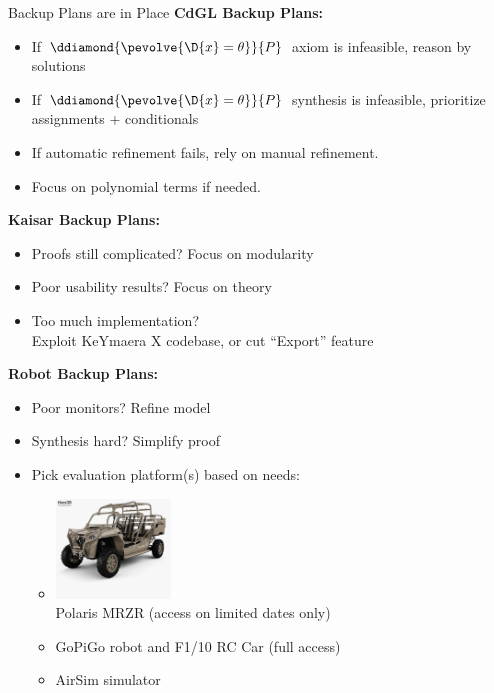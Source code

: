 \documentclass[slidestop,aspectratio=169]{beamer}
\providecommand{\KeYmaeraX}{KeYmaera X\xspace}
\theoremstyle{plain}
\theoremstyle{definition}
\theoremstyle{remark}
\begin{document}
\begin{frame}[t,allowframebreaks]{Backup Plans are in Place}
\textbf{CdGL Backup Plans:}
\begin{itemize}
\item If $\ddiamond{\pevolve{\D{x}=\theta}}{P}$ axiom is infeasible, reason by solutions
\item If $\ddiamond{\pevolve{\D{x}=\theta}}{P}$ synthesis is infeasible, prioritize assignments + conditionals
\item If automatic refinement fails, rely on manual refinement.
\item Focus on polynomial terms if needed.
\end{itemize}
\framebreak
\textbf{Kaisar Backup Plans:}
\begin{itemize}
\item Proofs still complicated? Focus on modularity
\item Poor usability results? Focus on theory
\item Too much implementation? \\Exploit \KeYmaeraX codebase, or cut ``Export'' feature
\end{itemize}
\framebreak

{\textbf{Robot Backup Plans:}
\begin{itemize}
\item Poor monitors? Refine model
\item Synthesis hard? Simplify proof
\item Pick evaluation platform(s) based on needs:
\begin{itemize}
\item\includegraphics[width=1.2in]{img/mrzr.jpg}\\
Polaris MRZR (access on limited dates only)
\item GoPiGo robot and F1/10 RC Car (full access)
\item AirSim simulator
\end{itemize}
\end{itemize}}
\end{frame}
\end{document}
